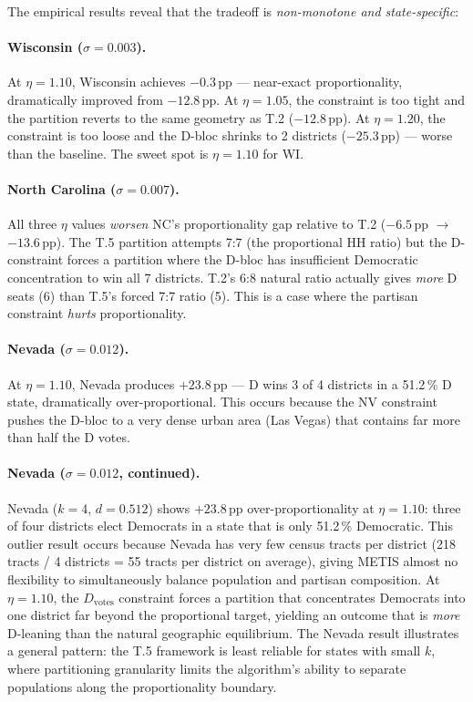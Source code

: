The empirical results reveal that the tradeoff is \emph{non-monotone and state-specific}:

\paragraph{Wisconsin ($\sigma = 0.003$).}
At $\eta = 1.10$, Wisconsin achieves $-0.3$\,pp --- near-exact proportionality,
dramatically improved from $-12.8$\,pp.
At $\eta = 1.05$, the constraint is too tight and the partition reverts to the
same geometry as T.2 ($-12.8$\,pp).
At $\eta = 1.20$, the constraint is too loose and the D-bloc shrinks to
2 districts ($-25.3$\,pp) --- worse than the baseline.
The sweet spot is $\eta = 1.10$ for WI.

\paragraph{North Carolina ($\sigma = 0.007$).}
All three $\eta$ values \emph{worsen} NC's proportionality gap relative to T.2
($-6.5$\,pp $\to$ $-13.6$\,pp).
The T.5 partition attempts 7:7 (the proportional HH ratio) but the D-constraint
forces a partition where the D-bloc has insufficient Democratic concentration
to win all 7 districts.
T.2's 6:8 natural ratio actually gives \emph{more} D seats (6) than T.5's
forced 7:7 ratio (5).
This is a case where the partisan constraint \emph{hurts} proportionality.

\paragraph{Nevada ($\sigma = 0.012$).}
At $\eta = 1.10$, Nevada produces $+23.8$\,pp --- D wins 3 of 4 districts in
a 51.2\,\% D state, dramatically over-proportional.
This occurs because the NV constraint pushes the D-bloc to a very dense urban
area (Las Vegas) that contains far more than half the D votes.

\paragraph{Nevada ($\sigma = 0.012$, continued).}
Nevada ($k = 4$, $d = 0.512$) shows $+23.8$\,pp over-proportionality at
$\eta = 1.10$: three of four districts elect Democrats in a state that is only
51.2\,\% Democratic.
This outlier result occurs because Nevada has very few census tracts per
district (218 tracts / 4 districts = 55 tracts per district on average),
giving METIS almost no flexibility to simultaneously balance population and
partisan composition.
At $\eta = 1.10$, the $D_{\text{votes}}$ constraint forces a partition that
concentrates Democrats into one district far beyond the proportional target,
yielding an outcome that is \emph{more} D-leaning than the natural geographic
equilibrium.
The Nevada result illustrates a general pattern: the T.5 framework is least
reliable for states with small $k$, where partitioning granularity limits the
algorithm's ability to separate populations along the proportionality boundary.

